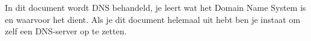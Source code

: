 In dit document wordt DNS behandeld, je leert wat het Domain Name System is en waarvoor het dient. Als je dit document helemaal uit hebt ben je instaat om zelf een DNS-server op te zetten.
